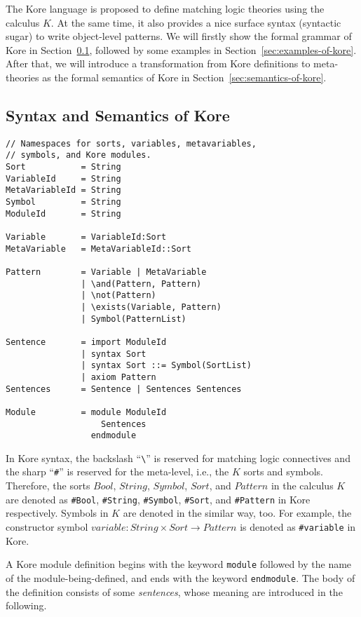 \documentclass[UTF8]{article}
\theoremstyle{plain}
\theoremstyle{definition}
\theoremstyle{remark}
\begin{document}
The Kore language is proposed to define matching logic theories using the 
calculus $K$. 
At the same time, it also provides a nice surface syntax 
(syntactic sugar) to write object-level patterns. 
We will firstly show the formal grammar of Kore in 
Section~\ref{sec:syntax-of-kore}, followed by some examples in 
Section~\ref{sec:examples-of-kore}.
After that, we will introduce a transformation from Kore definitions to 
meta-theories as the formal semantics of Kore in 
Section~\ref{sec:semantics-of-kore}.

\subsection{Syntax and Semantics of Kore}
\label{sec:syntax-of-kore}

\begin{Verbatim}[fontsize=\small]
// Namespaces for sorts, variables, metavariables,
// symbols, and Kore modules.
Sort           = String
VariableId     = String
MetaVariableId = String
Symbol         = String
ModuleId       = String

Variable       = VariableId:Sort
MetaVariable   = MetaVariableId::Sort

Pattern        = Variable | MetaVariable
               | \and(Pattern, Pattern)
               | \not(Pattern)
               | \exists(Variable, Pattern)
               | Symbol(PatternList)

Sentence       = import ModuleId
               | syntax Sort
               | syntax Sort ::= Symbol(SortList)
               | axiom Pattern
Sentences      = Sentence | Sentences Sentences

Module         = module ModuleId
                   Sentences
                 endmodule
\end{Verbatim}

In Kore syntax, the backslash ``\verb|\|'' is reserved for matching logic connectives and the sharp ``\verb|#|'' is reserved for the meta-level, i.e., the $K$ sorts and symbols. 
Therefore, the sorts $\mathit{Bool}$, $\mathit{String}$, $\mathit{Symbol}$, $\mathit{Sort}$, and $\mathit{Pattern}$ in the calculus $K$ are denoted as \verb|#Bool|, \verb|#String|, \verb|#Symbol|, \verb|#Sort|, and \verb|#Pattern| in Kore respectively.
Symbols in $K$ are denoted in the similar way, too. 
For example, the constructor symbol $\mathit{variable} \colon \mathit{String} \times \mathit{Sort} \to \mathit{Pattern}$ is denoted as \verb|#variable| in Kore. 

A Kore module definition begins with the keyword \verb|module| followed by the name of the module-being-defined, and ends with the keyword \verb|endmodule|. The body of the definition consists of some \emph{sentences}, whose meaning are introduced in the following.
\end{document}

